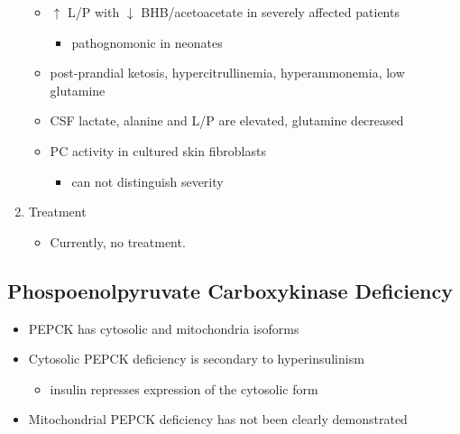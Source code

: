 \documentclass{scrartcl}
\begin{document}
\begin{enumerate}
\begin{itemize}
\item \(\uparrow\) L/P with \(\downarrow\) BHB/acetoacetate in severely affected patients
\begin{itemize}
\item pathognomonic in neonates
\end{itemize}

\item post-prandial ketosis, hypercitrullinemia, hyperammonemia, low glutamine

\item CSF lactate, alanine and L/P are elevated, glutamine decreased

\item PC activity in cultured skin fibroblasts
\begin{itemize}
\item can not distinguish severity
\end{itemize}
\end{itemize}

\item Treatment
\label{sec:org696ac37}

\begin{itemize}
\item Currently, no treatment.
\end{itemize}
\end{enumerate}

\subsection{Phospoenolpyruvate Carboxykinase Deficiency}
\label{sec:orgca828c1}
\begin{itemize}
\item PEPCK has cytosolic and mitochondria isoforms
\item Cytosolic PEPCK deficiency is secondary to hyperinsulinism
\begin{itemize}
\item insulin represses expression of the cytosolic form
\end{itemize}
\item Mitochondrial PEPCK deficiency has not been clearly demonstrated
\end{itemize}
\end{document}
